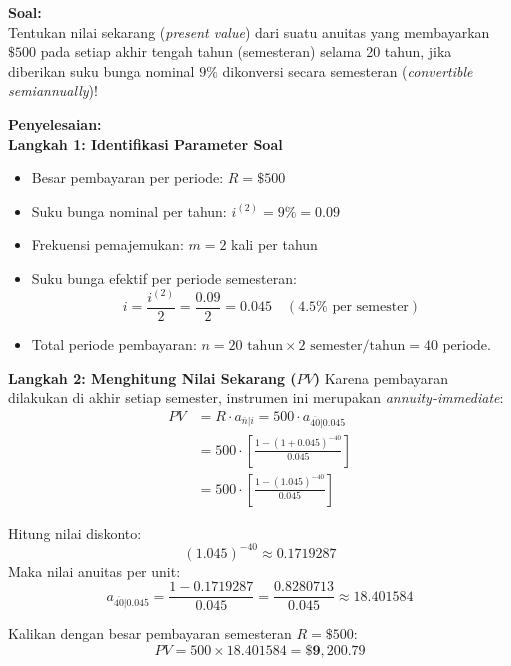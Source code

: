 \documentclass[11pt,a4paper]{article}
\begin{document}
\begin{examplebox}
\textbf{Soal:}\\
Tentukan nilai sekarang (\textit{present value}) dari suatu anuitas yang membayarkan $\$500$ pada setiap akhir tengah tahun (semesteran) selama 20 tahun, jika diberikan suku bunga nominal $9\%$ dikonversi secara semesteran (\textit{convertible semiannually})!

\vspace{0.5em}
\textbf{Penyelesaian:}\\
\textbf{Langkah 1: Identifikasi Parameter Soal}
\begin{itemize}
    \item Besar pembayaran per periode: $R = \$500$
    \item Suku bunga nominal per tahun: $i^{(2)} = 9\% = 0.09$
    \item Frekuensi pemajemukan: $m = 2$ kali per tahun
    \item Suku bunga efektif per periode semesteran:
    \begin{equation*}
        i = \frac{i^{(2)}}{2} = \frac{0.09}{2} = 0.045 \quad (4.5\% \text{ per semester})
    \end{equation*}
    \item Total periode pembayaran: $n = 20 \text{ tahun} \times 2 \text{ semester/tahun} = 40 \text{ periode}$.
\end{itemize}

\textbf{Langkah 2: Menghitung Nilai Sekarang ($PV$)}
Karena pembayaran dilakukan di akhir setiap semester, instrumen ini merupakan \textit{annuity-immediate}:
\begin{align*}
    PV &= R \cdot a_{\overline{n}|i} = 500 \cdot a_{\overline{40}|0.045} \\[0.4em]
       &= 500 \cdot \left[ \frac{1 - (1 + 0.045)^{-40}}{0.045} \right] \\[0.4em]
       &= 500 \cdot \left[ \frac{1 - (1.045)^{-40}}{0.045} \right]
\end{align*}

Hitung nilai diskonto:
\begin{equation*}
    (1.045)^{-40} \approx 0.1719287
\end{equation*}
Maka nilai anuitas per unit:
\begin{equation*}
    a_{\overline{40}|0.045} = \frac{1 - 0.1719287}{0.045} = \frac{0.8280713}{0.045} \approx 18.401584
\end{equation*}

Kalikan dengan besar pembayaran semesteran $R = \$500$:
\begin{equation*}
    PV = 500 \times 18.401584 = \mathbf{\$9{,}200.79}
\end{equation*}
\end{examplebox}
\end{document}

